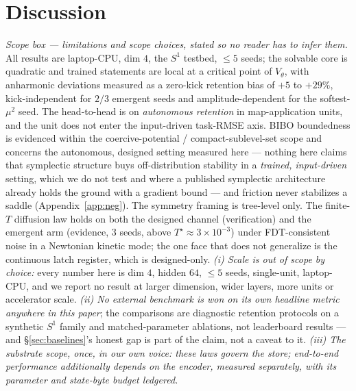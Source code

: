 \documentclass{article}
\begin{document}
\section{Discussion}\label{sec:discussion}

{\footnotesize
\emph{Scope box --- limitations and scope choices, stated so no reader has to infer them.} All results are laptop-CPU, dim $4$, the $S^1$ testbed, $\le5$ seeds; the solvable core is quadratic and trained statements are local at a critical point of $V_\theta$, with anharmonic deviations measured as a zero-kick retention bias of $+5$ to $+29\%$, kick-independent for $2/3$ emergent seeds and amplitude-dependent for the softest-$\mu^2$ seed. The head-to-head is on \emph{autonomous retention} in map-application units, and the unit does not enter the input-driven task-RMSE axis. BIBO boundedness is evidenced within the coercive-potential / compact-sublevel-set scope and concerns the autonomous, designed setting measured here --- nothing here claims that symplectic structure buys off-distribution stability in a \emph{trained, input-driven} setting, which we do not test and where a published symplectic architecture already holds the ground with a gradient bound --- and friction never stabilizes a saddle (Appendix~\ref{app:neg}). The symmetry framing is tree-level only. The finite-$T$ diffusion law holds on both the designed channel (verification) and the emergent arm (evidence, $3$ seeds, above $T^\star\approx3\!\times\!10^{-3}$) under FDT-consistent noise in a Newtonian kinetic mode; the one face that does not generalize is the continuous latch register, which is designed-only. \emph{(i) Scale is out of scope by choice:} every number here is dim $4$, hidden $64$, $\le5$ seeds, single-unit, laptop-CPU, and we report no result at larger dimension, wider layers, more units or accelerator scale. \emph{(ii) No external benchmark is won on its own headline metric anywhere in this paper}; the comparisons are diagnostic retention protocols on a synthetic $S^1$ family and matched-parameter ablations, not leaderboard results --- and \S\ref{sec:baselines}'s honest gap is part of the claim, not a caveat to it. \emph{(iii) The substrate scope, once, in our own voice: these laws govern the store; end-to-end performance additionally depends on the encoder, measured separately, with its parameter and state-byte budget ledgered.}
\par}
\end{document}
